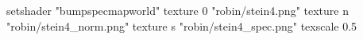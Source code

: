 setshader "bumpspecmapworld"
   texture 0 "robin/stein4.png"
   texture n "robin/stein4_norm.png"
   texture s "robin/stein4_spec.png"
texscale 0.5